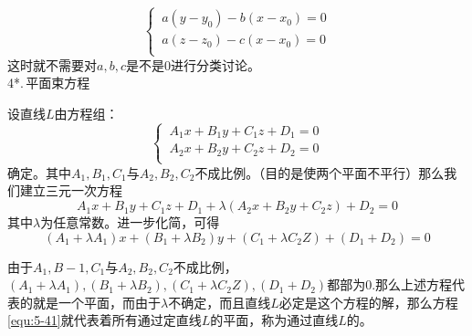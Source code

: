 \begin{equation}
	\begin{cases}
		\, a(y-y_0)-b(x-x_0)=0\\
		\, a(z-z_0)-c(x-x_0)=0\\
	\end{cases}
\end{equation}
这时就不需要对$a,b,c$是不是0进行分类讨论。
\\ 4*.$\,$平面束方程
\par 设直线$L$由方程组：
\begin{equation}
	\begin{cases}
\, A_1x+B_1y+C_1z+D_1=0\\
\, A_2x+B_2y+C_2z+D_2=0\\
\end{cases}
\end{equation}
确定。其中$A_1,B_1,C_1$与$A_2,B_2,C_2$不成比例。（目的是使两个平面不平行）那么我们建立三元一次方程
\begin{equation}
	A_1x+B_1y+C_1z+D_1+\lambda(A_2x+B_2y+C_2z)+D_2=0
\label{equ:5-41}	
\end{equation}
其中$\lambda$为任意常数。进一步化简，可得
\begin{equation}
	(A_1+\lambda A_1)x+(B_1+\lambda B_2)y+(C_1+\lambda C_2Z)+(D_1+D_2)=0
\end{equation}
\par 由于$A_1,B-1,C_1$与$A_2,B_2,C_2$不成比例，$(A_1+\lambda A_1),(B_1+\lambda B_2),(C_1+\lambda C_2Z),(D_1+D_2)$都部为0.那么上述方程代表的就是一个平面，而由于$\lambda$不确定，而且直线$L$必定是这个方程的解，那么方程\ref{equ:5-41}就代表着所有通过定直线$L$的平面，称为通过直线$L$的。
